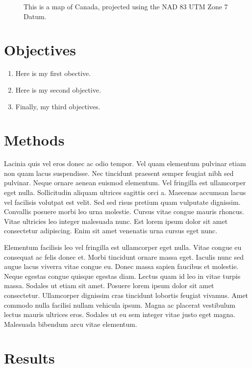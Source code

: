 \documentclass[article,30pt,extrafontsizes,showtrims]{memoir}
\begin{document}
\begin{multicols*}{3}
{\begin{figure}
{}

\caption{This is a map of Canada, projected using the NAD 83 UTM Zone 7 Datum.}\label{fig:unnamed-chunk-2}
\end{figure}

\section{Objectives}\label{objectives}

\begin{enumerate}
\def\labelenumi{\arabic{enumi}.}
\tightlist
\item
  Here is my first obective.
\item
  Here is my second objective.
\item
  Finally, my third objectives.
\end{enumerate}

\section{Methods}\label{methods}

Lacinia quis vel eros donec ac odio tempor. Vel quam elementum pulvinar
etiam non quam lacus suspendisse. Nec tincidunt praesent semper feugiat
nibh sed pulvinar. Neque ornare aenean euismod elementum. Vel fringilla
est ullamcorper eget nulla. Sollicitudin aliquam ultrices sagittis orci
a. Maecenas accumsan lacus vel facilisis volutpat est velit. Sed sed
risus pretium quam vulputate dignissim. Convallis posuere morbi leo urna
molestie. Cursus vitae congue mauris rhoncus. Vitae ultricies leo
integer malesuada nunc. Est lorem ipsum dolor sit amet consectetur
adipiscing. Enim sit amet venenatis urna cursus eget nunc.

Elementum facilisis leo vel fringilla est ullamcorper eget nulla. Vitae
congue eu consequat ac felis donec et. Morbi tincidunt ornare massa
eget. Iaculis nunc sed augue lacus viverra vitae congue eu. Donec massa
sapien faucibus et molestie. Neque egestas congue quisque egestas diam.
Lectus quam id leo in vitae turpis massa. Sodales ut etiam sit amet.
Posuere lorem ipsum dolor sit amet consectetur. Ullamcorper dignissim
cras tincidunt lobortis feugiat vivamus. Amet commodo nulla facilisi
nullam vehicula ipsum. Magna ac placerat vestibulum lectus mauris
ultrices eros. Sodales ut eu sem integer vitae justo eget magna.
Malesuada bibendum arcu vitae elementum.

\section{Results}\label{results}

}
\end{multicols*}
\end{document}
